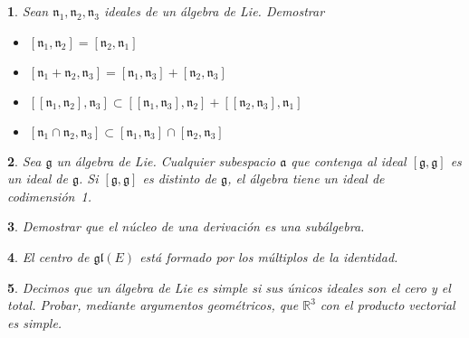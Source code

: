 \documentclass[a4paper,draft,12pt]{article}
\newtheorem{pro1}{}%
\newenvironment{pro}{\begin{pro1} \rm} {\end{pro1}}
\newcommand{\R}{\mathbb{R}}%
\newcommand{\g}{\mathfrak{g}}%
\begin{document}
\begin{pro}

Sean $\mathfrak{n_1}, \mathfrak{n_2}, \mathfrak{n_3}$ ideales de un álgebra de Lie.  Demostrar

\begin{itemize}

\item $ [\mathfrak{n_1}, \mathfrak{n_2}]= [\mathfrak{n_2}, \mathfrak{n_1}]$

\item $ [\mathfrak{n_1}+ \mathfrak{n_2}, \mathfrak{n_3}]= [\mathfrak{n_1}, \mathfrak{n_3}]+ [\mathfrak{n_2}, \mathfrak{n_3}]$

\item $[[\mathfrak{n_1}, \mathfrak{n_2}],\mathfrak{n_3}] \subset [[\mathfrak{n_1}, \mathfrak{n_3}],\mathfrak{n_2}]+[[\mathfrak{n_2},\mathfrak{n_3}],\mathfrak{n_1}]$

\item $[ \mathfrak{n_1} \cap \mathfrak{n_2}, \mathfrak{n_3}] \subset [\mathfrak{n_1}, \mathfrak{n_3}] \cap [\mathfrak{n_2}, \mathfrak{n_3}]$

\end{itemize}

\end{pro}

\begin{pro}

Sea $\g$ un álgebra de Lie.  Cualquier subespacio $\mathfrak{a}$ que contenga al ideal $[\g,\g]$ es un ideal de $\g$. Si $[\g,\g]$ es distinto de $\g$, el álgebra tiene un ideal de codimensión~1.

\end{pro}





\begin{pro}

Demostrar que el núcleo de una derivación es una subálgebra.

\end{pro}
  

\begin{pro}

El centro de $\mathfrak{gl}(E)$ está formado por los múltiplos de la identidad.

\end{pro}

\begin{pro}

Decimos que un álgebra de Lie es simple si sus únicos ideales son el cero y el total. Probar, mediante argumentos geométricos, que $\R^3$ con el producto vectorial es simple.

\end{pro}
\end{document}
